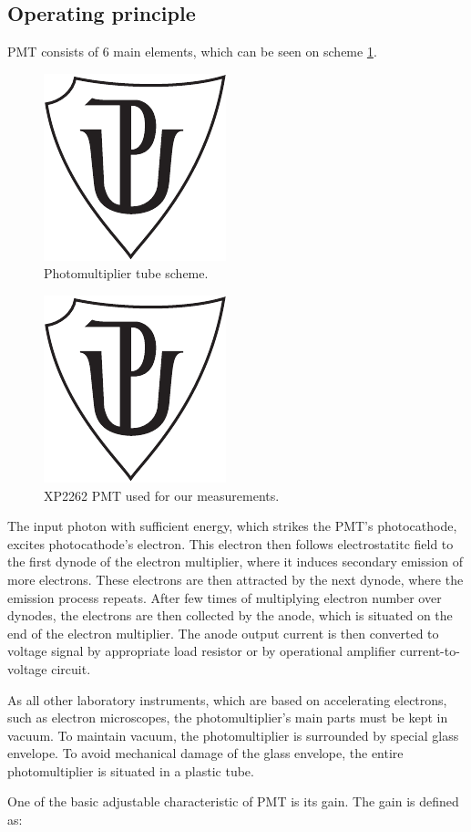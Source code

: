 \subsection{Operating principle}
PMT consists of 6 main elements, which can be seen on scheme \ref{PMT scheme}.

\begin{figure}[H]
 \centering
 \includegraphics{up_logo_bw}
 \caption{Photomultiplier tube scheme.}
 \label{PMT scheme}
\end{figure}

\begin{figure}[H]
 \centering
 \includegraphics{up_logo_bw}
 \caption{XP2262 PMT used for our measurements.}
 \label{XP2262 PMT}
\end{figure}

\par
The input photon with sufficient energy, which strikes the PMT's photocathode, excites photocathode's electron. This electron then follows electrostatitc field to the first dynode of the electron multiplier, where it induces secondary emission of more electrons. These electrons are then attracted by the next dynode, where the emission process repeats. After few times of multiplying electron number over dynodes, the electrons are then collected by 
the anode, which is situated on the end of the electron multiplier. The anode output current is then converted to voltage signal by appropriate load resistor or by operational amplifier current-to-voltage circuit.
\par
As all other laboratory instruments, which are based on accelerating electrons, such as electron microscopes, the photomultiplier's main parts must be kept in vacuum. To maintain vacuum, the photomultiplier is surrounded by special glass envelope. To avoid mechanical damage of the glass envelope, the entire photomultiplier is situated in a plastic tube.
\par
One of the basic adjustable characteristic of PMT is its gain. The gain is defined as:

